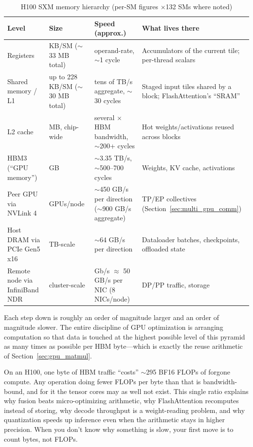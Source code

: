 \begin{table}[H]
\centering
\small
\caption{H100 SXM memory hierarchy (per-SM figures $\times$132 SMs where noted)}
\label{tab:gpu_mem_hierarchy}
\begin{tabularx}{\textwidth}{>{\raggedright\arraybackslash}p{2.7cm}>{\raggedright\arraybackslash}p{2.9cm}>{\raggedright\arraybackslash}p{3.4cm}X}
\toprule
\textbf{Level} & \textbf{Size} & \textbf{Speed (approx.)} & \textbf{What lives there} \\
\midrule
Registers & 256 KB/SM ($\sim$33 MB total) & operand-rate, $\sim$1 cycle & Accumulators of the current tile; per-thread scalars \\
Shared memory / L1 & up to 228 KB/SM ($\sim$30 MB total) & tens of TB/s aggregate, $\sim$30 cycles & Staged input tiles shared by a block; FlashAttention's ``SRAM'' \\
L2 cache & 50 MB, chip-wide & several $\times$ HBM bandwidth, $\sim$200+ cycles & Hot weights/activations reused across blocks \\
HBM3 (``GPU memory'') & 80 GB & $\sim$3.35 TB/s, $\sim$500--700 cycles & Weights, KV cache, activations \\
Peer GPU via NVLink 4 & 8 GPUs/node & $\sim$450 GB/s per direction ($\sim$900 GB/s aggregate) & TP/EP collectives (Section~\ref{sec:multi_gpu_comm}) \\
Host DRAM via PCIe Gen5 x16 & TB-scale & $\sim$64 GB/s per direction & Dataloader batches, checkpoints, offloaded state \\
Remote node via InfiniBand NDR & cluster-scale & 400 Gb/s $\approx$ 50 GB/s per NIC (8 NICs/node) & DP/PP traffic, storage \\
\bottomrule
\end{tabularx}
\end{table}

Each step down is roughly an order of magnitude larger and an order of magnitude slower. The entire discipline of GPU optimization is arranging computation so that data is touched at the highest possible level of this pyramid as many times as possible per HBM byte---which is exactly the reuse arithmetic of Section~\ref{sec:gpu_matmul}.

\begin{keyinsight}
On an H100, one byte of HBM traffic ``costs'' $\sim$295 BF16 FLOPs of forgone compute. Any operation doing fewer FLOPs per byte than that is bandwidth-bound, and for it the tensor cores may as well not exist. This single ratio explains why fusion beats micro-optimizing arithmetic, why FlashAttention recomputes instead of storing, why decode throughput is a weight-reading problem, and why quantization speeds up inference even when the arithmetic stays in higher precision. When you don't know why something is slow, your first move is to count bytes, not FLOPs.
\end{keyinsight}

